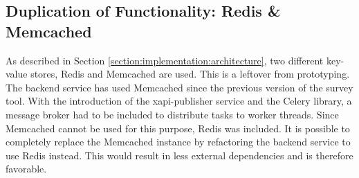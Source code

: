         \subsection{Duplication of Functionality: Redis \& Memcached}
        	As described in Section \ref{section:implementation:architecture},
        	two different key-value stores, Redis and Memcached are used.
        	This is a leftover from prototyping. The backend service
        	has used Memcached since the previous version of the survey tool.
        	With the introduction of the xapi-publisher service and
        	the Celery library, a message broker had to be included
        	to distribute tasks to worker threads. Since Memcached
        	cannot be used for this purpose, Redis was included.
        	It is possible to completely replace the Memcached instance
        	by refactoring the backend service to use Redis instead.
        	This would result in less external dependencies and
     		is therefore favorable.
